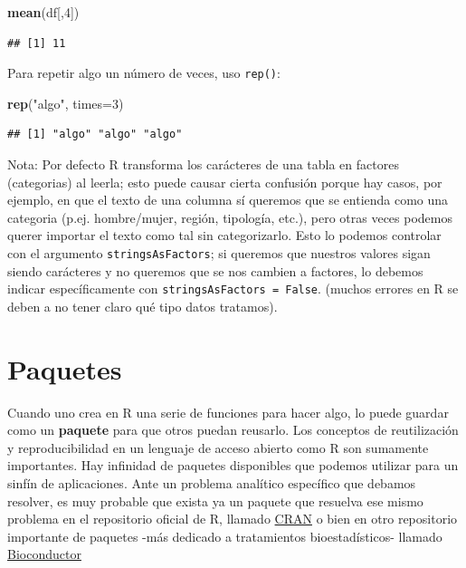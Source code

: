 \documentclass[]{book}
\newenvironment{Shaded}{\begin{snugshade}}{\end{snugshade}}
\newcommand{\KeywordTok}[1]{\textcolor[rgb]{0.13,0.29,0.53}{\textbf{{#1}}}}
\newcommand{\DataTypeTok}[1]{\textcolor[rgb]{0.13,0.29,0.53}{{#1}}}
\newcommand{\DecValTok}[1]{\textcolor[rgb]{0.00,0.00,0.81}{{#1}}}
\newcommand{\StringTok}[1]{\textcolor[rgb]{0.31,0.60,0.02}{{#1}}}
\newcommand{\NormalTok}[1]{{#1}}
\theoremstyle{definition}
\theoremstyle{definition}
\theoremstyle{remark}
\begin{document}
\begin{Shaded}
\begin{Highlighting}[]
\KeywordTok{mean}\NormalTok{(df[,}\DecValTok{4}\NormalTok{])}
\end{Highlighting}
\end{Shaded}

\begin{verbatim}
## [1] 11
\end{verbatim}

Para repetir algo un número de veces, uso \texttt{rep()}:

\begin{Shaded}
\begin{Highlighting}[]
\KeywordTok{rep}\NormalTok{(}\StringTok{"algo"}\NormalTok{, }\DataTypeTok{times=}\DecValTok{3}\NormalTok{)}
\end{Highlighting}
\end{Shaded}

\begin{verbatim}
## [1] "algo" "algo" "algo"
\end{verbatim}

Nota: Por defecto R transforma los carácteres de una tabla en factores
(categorias) al leerla; esto puede causar cierta confusión porque hay
casos, por ejemplo, en que el texto de una columna sí queremos que se
entienda como una categoria (p.ej. hombre/mujer, región, tipología,
etc.), pero otras veces podemos querer importar el texto como tal sin
categorizarlo. Esto lo podemos controlar con el argumento
\texttt{stringsAsFactors}; si queremos que nuestros valores sigan siendo
carácteres y no queremos que se nos cambien a factores, lo debemos
indicar específicamente con \texttt{stringsAsFactors\ =\ False}. (muchos
errores en R se deben a no tener claro qué tipo datos tratamos).

\section{Paquetes}\label{paquetes}

Cuando uno crea en R una serie de funciones para hacer algo, lo puede
guardar como un \textbf{paquete} para que otros puedan reusarlo. Los
conceptos de reutilización y reproducibilidad en un lenguaje de acceso
abierto como R son sumamente importantes. Hay infinidad de paquetes
disponibles que podemos utilizar para un sinfín de aplicaciones. Ante un
problema analítico específico que debamos resolver, es muy probable que
exista ya un paquete que resuelva ese mismo problema en el repositorio
oficial de R, llamado \href{https://cran.r-project.org/}{CRAN} o bien en
otro repositorio importante de paquetes -más dedicado a tratamientos
bioestadísticos- llamado
\href{https://www.bioconductor.org/}{Bioconductor}
\end{document}
